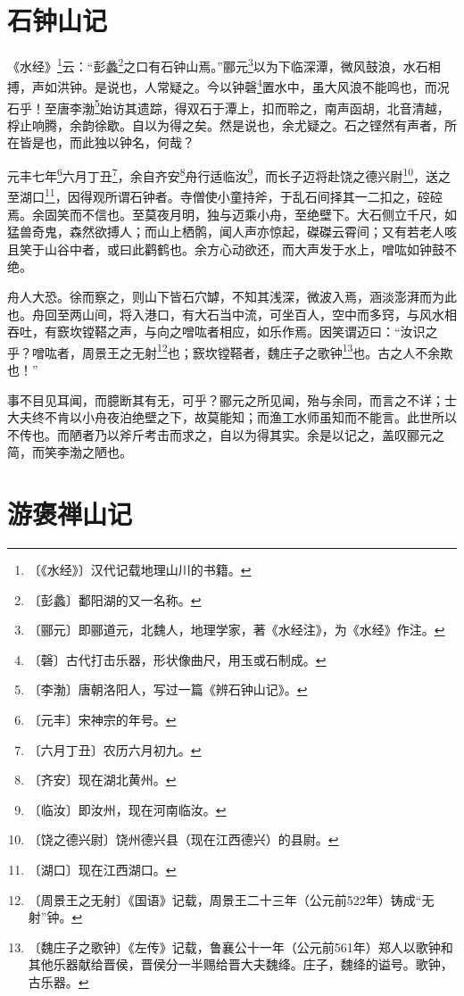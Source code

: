 \documentclass[12pt,UTF-8,openany]{ctexbook}
\begin{document}
\chapter{石钟山记}

\begin{normalsize}
    
    《水经》\footnote{〔《水经》〕汉代记载地理山川的书籍。}云：“彭蠡\footnote{〔彭蠡〕鄱阳湖的又一名称。}之口有石钟山焉。”郦元\footnote{〔郦元〕即郦道元，北魏人，地理学家，著《水经注》，为《水经》作注。}以为下临深潭，微风鼓浪，水石相搏，声如洪钟。是说也，人常疑之。今以钟磬\footnote{〔磬〕古代打击乐器，形状像曲尺，用玉或石制成。}置水中，虽大风浪不能鸣也，而况石乎！至唐李渤\footnote{〔李渤〕唐朝洛阳人，写过一篇《辨石钟山记》。}始访其遗踪，得双石于潭上，扣而聆之，南声函胡，北音清越，桴止响腾，余韵徐歇。自以为得之矣。然是说也，余尤疑之。石之铿然有声者，所在皆是也，而此独以钟名，何哉？
    
    元丰七年\footnote{〔元丰〕宋神宗的年号。}六月丁丑\footnote{〔六月丁丑〕农历六月初九。}，余自齐安\footnote{〔齐安〕现在湖北黄州。}舟行适临汝\footnote{〔临汝〕即汝州，现在河南临汝。}，而长子迈将赴饶之德兴尉\footnote{〔饶之德兴尉〕饶州德兴县（现在江西德兴）的县尉。}，送之至湖口\footnote{〔湖口〕现在江西湖口。}，因得观所谓石钟者。寺僧使小童持斧，于乱石间择其一二扣之，硿硿焉。余固笑而不信也。至莫夜月明，独与迈乘小舟，至绝壁下。大石侧立千尺，如猛兽奇鬼，森然欲搏人；而山上栖鹘，闻人声亦惊起，磔磔云霄间；又有若老人咳且笑于山谷中者，或曰此鹳鹤也。余方心动欲还，而大声发于水上，噌吰如钟鼓不绝。
    
    舟人大恐。徐而察之，则山下皆石穴罅，不知其浅深，微波入焉，涵淡澎湃而为此也。舟回至两山间，将入港口，有大石当中流，可坐百人，空中而多窍，与风水相吞吐，有窾坎镗鞳之声，与向之噌吰者相应，如乐作焉。因笑谓迈曰：“汝识之乎？噌吰者，周景王之无射\footnote{〔周景王之无射〕《国语》记载，周景王二十三年（公元前522年）铸成“无射”钟。}也；窾坎镗鞳者，魏庄子之歌钟\footnote{〔魏庄子之歌钟〕《左传》记载，鲁襄公十一年（公元前561年）郑人以歌钟和其他乐器献给晋侯，晋侯分一半赐给晋大夫魏绛。庄子，魏绛的谥号。歌钟，古乐器。}也。古之人不余欺也！”
    
    事不目见耳闻，而臆断其有无，可乎？郦元之所见闻，殆与余同，而言之不详；士大夫终不肯以小舟夜泊绝壁之下，故莫能知；而渔工水师虽知而不能言。此世所以不传也。而陋者乃以斧斤考击而求之，自以为得其实。余是以记之，盖叹郦元之简，而笑李渤之陋也。
\end{normalsize}



\chapter{游褒禅山记}
\end{document}
